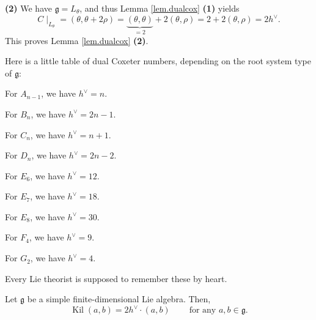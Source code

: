 \documentclass[etingof-lie.tex]{subfiles}
\begin{document}
\textbf{(2)} We have $\mathfrak{g}=L_{\theta}$, and thus Lemma
\ref{lem.dualcox} \textbf{(1)} yields%
\[
C\mid_{L_{\theta}}=\left(  \theta,\theta+2\rho\right)  =\underbrace{\left(
\theta,\theta\right)  }_{=2}+2\left(  \theta,\rho\right)  =2+2\left(
\theta,\rho\right)  =2h^{\vee}.
\]
This proves Lemma \ref{lem.dualcox} \textbf{(2)}.

Here is a little table of dual Coxeter numbers, depending on the root system
type of $\mathfrak{g}$:

For $A_{n-1}$, we have $h^{\vee}=n$.

For $B_{n}$, we have $h^{\vee}=2n-1$.

For $C_{n}$, we have $h^{\vee}=n+1$.

For $D_{n}$, we have $h^{\vee}=2n-2$.

For $E_{6}$, we have $h^{\vee}=12$.

For $E_{7}$, we have $h^{\vee}=18$.

For $E_{8}$, we have $h^{\vee}=30$.

For $F_{4}$, we have $h^{\vee}=9$.

For $G_{2}$, we have $h^{\vee}=4$.

Every Lie theorist is supposed to remember these by heart.

\begin{lemma}
\label{lem.dualcox.kil}Let $\mathfrak{g}$ be a simple finite-dimensional Lie
algebra. Then,%
\[
\operatorname*{Kil}\left(  a,b\right)  =2h^{\vee}\cdot\left(  a,b\right)
\ \ \ \ \ \ \ \ \ \ \text{for any }a,b\in\mathfrak{g}.
\]

\end{lemma}
\end{document}
